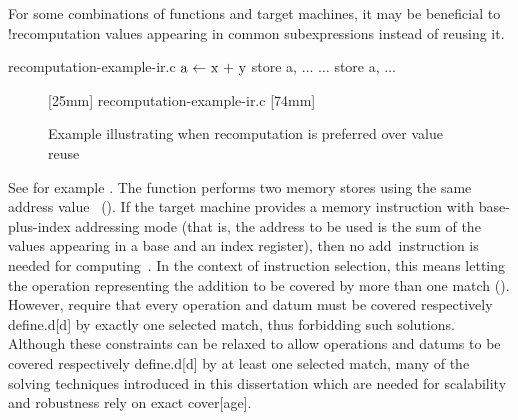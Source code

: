 For some combinations of \glspl{function} and \glspl{target machine}, it may be
beneficial to \glsshort!{recomputation} values appearing in common
subexpressions instead of reusing it.
%
\begin{filecontents*}{recomputation-example-ir.c}
$\irAssign{a}{x + y}$
store a, $\ldots$
$\ldots$
store a, $\ldots$
\end{filecontents*}
%
\begin{figure}
  \centering%
  \mbox{}%
  \hfill%
                [25mm]%
                {%
                                  {recomputation-example-ir.c}%
                }%
  \hfill%
                [74mm]%
                {%
                }%
  \hfill%
  \mbox{}

  \caption{%
    Example illustrating when recomputation is preferred over value reuse%
  }%
\end{figure}
%
See for example .
%
The \gls{function} performs two memory stores using the same address
value~ ().
%
If the \gls{target machine} provides a memory \gls{instruction} with
base-plus-index addressing mode (that is, the address to be used is the sum of
the values appearing in a base and an index \gls{register}), then no
add~\gls{instruction} is needed for computing~.
%
In the context of \gls{instruction selection}, this means letting the
\gls{operation} representing the addition to be covered by more than one
\gls{match} ().
%
However,  require that
every \gls{operation} and \gls{datum} must be covered respectively
\gls{define.d}[d] by exactly one selected \gls{match}, thus forbidding such
\glspl{solution}.
%
Although these \glspl{constraint} can be relaxed to allow \glspl{operation} and
\glspl{datum} to be covered respectively \gls{define.d}[d] by at least one
selected \gls{match}, many of the solving techniques introduced in this
dissertation which are needed for scalability and robustness rely on exact
\gls{cover}[age].


